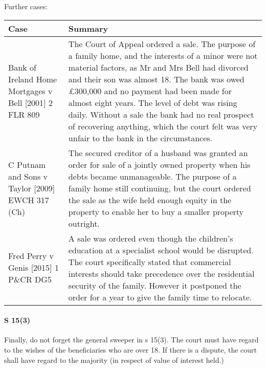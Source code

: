 \documentclass[
]{article}
\begin{document}
Further cases:

\begin{longtable}[]{@{}ll@{}}
\toprule()
Case & Summary \\
\midrule()
\endhead
Bank of Ireland Home Mortgages v Bell {[}2001{]} 2 FLR 809 & The Court
of Appeal ordered a sale. The purpose of a family home, and the
interests of a minor were not material factors, as Mr and Mrs Bell had
divorced and their son was almost 18. The bank was owed £300,000 and no
payment had been made for almost eight years. The level of debt was
rising daily. Without a sale the bank had no real prospect of recovering
anything, which the court felt was very unfair to the bank in the
circumstances. \\
C Putnam and Sons v Taylor {[}2009{]} EWCH 317 (Ch) & The secured
creditor of a husband was granted an order for sale of a jointly owned
property when his debts became unmanageable. The purpose of a family
home still continuing, but the court ordered the sale as the wife held
enough equity in the property to enable her to buy a smaller property
outright. \\
Fred Perry v Genis {[}2015{]} 1 P\&CR DG5 & A sale was ordered even
though the children's education at a specialist school would be
disrupted. The court specifically stated that commercial interests
should take precedence over the residential security of the family.
However it postponed the order for a year to give the family time to
relocate. \\
\bottomrule()
\end{longtable}

\hypertarget{s-153}{%
\paragraph{S 15(3)}\label{s-153}}

Finally, do not forget the general sweeper in s 15(3). The court must
have regard to the wishes of the beneficiaries who are over 18. If there
is a dispute, the court shall have regard to the majority (in respect of
value of interest held.)
\end{document}
